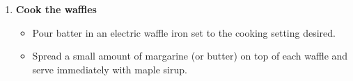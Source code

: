 \documentclass[11pt,letterpaper]{article}
\begin{document}
\begin{description}
\begin{enumerate}
	\item {\bf Cook the waffles}
	\begin{itemize}
	\item Pour batter in an electric waffle iron set to the cooking setting desired.
	\item Spread a small amount of margarine (or butter) on top of each waffle and serve immediately with maple sirup. 
	\end{itemize}

	\end{enumerate}
\end{description}
\end{document}
